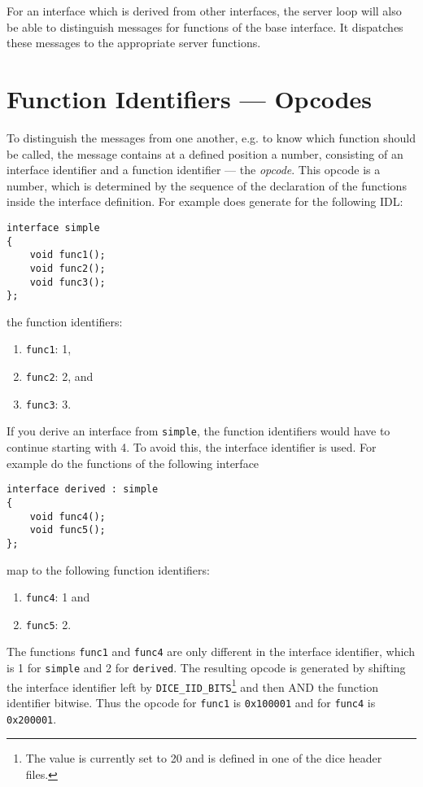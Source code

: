 For an interface which is derived from other interfaces, the
server loop will also be able to distinguish messages for functions
of the base interface. It dispatches these messages to the appropriate
server functions.

\section{Function Identifiers --- Opcodes}
\label{sec:opcode}
To distinguish the messages from one another, e.g. to know which 
function should be called, the message contains at a defined position
a number, consisting of an interface identifier and a function identifier 
 --- the {\em opcode}. This opcode is a number, which is determined by 
the sequence of the declaration of the functions inside the interface 
definition. For example does \dice{} generate for the following IDL:

\begin{verbatim}
interface simple
{
    void func1();
    void func2();
    void func3();
};
\end{verbatim}

the function identifiers:

\begin{enumerate}
\item \verb|func1|: 1,
\item \verb|func2|: 2, and
\item \verb|func3|: 3.
\end{enumerate}

If you derive an interface from \verb|simple|, the function identifiers
would have to continue starting with 4. To avoid this, the interface identifier
is used. For example do the functions of the following interface

\begin{verbatim}
interface derived : simple
{
    void func4();
    void func5();
};
\end{verbatim}

map to the following function identifiers:

\begin{enumerate}
\item \verb|func4|: 1 and
\item \verb|func5|: 2.
\end{enumerate}

The functions \verb|func1| and \verb|func4| are only different in the
interface identifier, which is 1 for \verb|simple| and 2 for 
\verb|derived|. The resulting opcode is generated by shifting the 
interface identifier left by \verb|DICE_IID_BITS|\footnote{The value
is currently set to 20 and is defined in one of the dice header files.}
and then AND the function identifier bitwise. Thus the opcode for 
\verb|func1| is \verb|0x100001| and for \verb|func4| is \verb|0x200001|.

